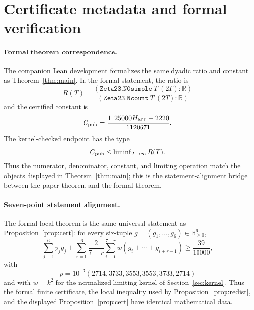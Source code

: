 \documentclass[11pt]{article}
\begin{document}
\section{Certificate metadata and formal verification}\label{app:cert}

\paragraph{Formal theorem correspondence.}
The companion Lean development formalizes the same dyadic ratio and constant
as Theorem~\ref{thm:main}.  In the formal statement, the ratio is
\[
 R(T)
 =
 \frac{(\texttt{Zeta23.N0simple}\ T\ (2T):\mathbb R)}
      {(\texttt{Zeta23.Ncount}\ T\ (2T):\mathbb R)}
\]
and the certified constant is
\[
 C_{\rm pub}
 =
 \frac{1125000H_{\rm MT}-2220}{1120671}.
\]
The kernel-checked endpoint has the type
\[
 C_{\rm pub}
 \le
 \operatorname{liminf}_{T\to\infty}R(T).
\]
Thus the numerator, denominator, constant, and limiting operation match the
objects displayed in Theorem~\ref{thm:main}; this is the statement-alignment
bridge between the paper theorem and the formal theorem.

\paragraph{Seven-point statement alignment.}
The formal local theorem is the same universal statement as
Proposition~\ref{prop:cert}: for every six-tuple
$g=(g_1,\ldots,g_6)\in\mathbb R_{\ge0}^6$,
\[
 \sum_{j=1}^6p_jg_j+
 \sum_{r=1}^6\frac{2}{7-r}
 \sum_{i=1}^{7-r}
 w(g_i+\cdots+g_{i+r-1})
 \ge\frac{39}{10000},
\]
with
\[
 p=10^{-7}(2714,3733,3553,3553,3733,2714)
\]
and with $w=k^2$ for the normalized limiting kernel of
Section~\ref{sec:kernel}.  Thus the formal finite certificate, the local
inequality used by Proposition~\ref{prop:redist}, and the displayed
Proposition~\ref{prop:cert} have identical mathematical data.
\end{document}
